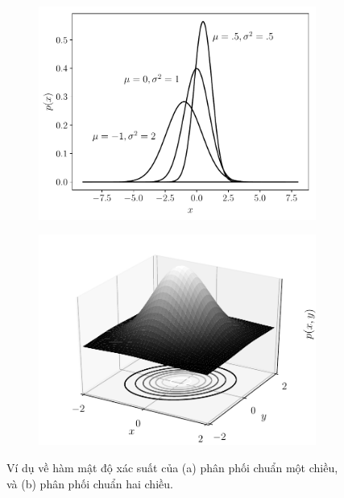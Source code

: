 \begin{figure}[t]
    \begin{subfigure}{0.49\textwidth}
    \includegraphics[width=0.99\linewidth]{Chapters/02_LinearAlgebra/30_prob/python/uni_norm.pdf}
    \caption{}   
    \label{fig:30_2a}
    \end{subfigure}
    \begin{subfigure}{0.49\textwidth}
    \includegraphics[width=0.99\linewidth]{Chapters/02_LinearAlgebra/30_prob/python/bi_norm.pdf}
    \caption{}
    \label{fig:30_2b}
    \end{subfigure}
    \caption{
    Ví dụ về hàm mật độ xác suất của (a) phân phối chuẩn một chiều, và (b) phân
    phối chuẩn hai chiều.}
    \label{fig:30_2}
\end{figure}

